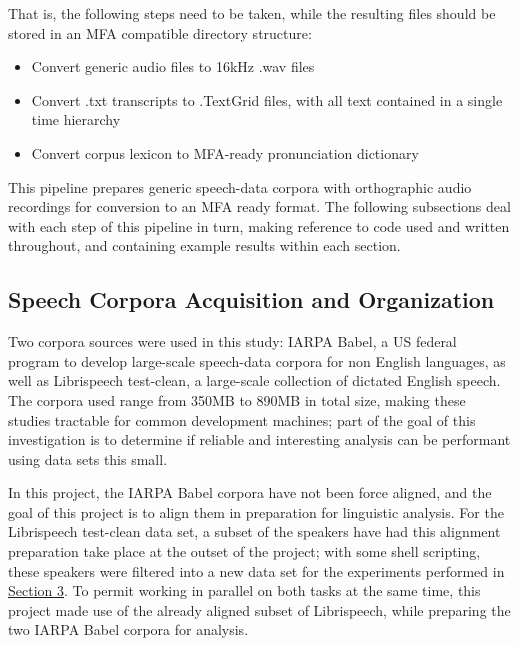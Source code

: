 \documentclass[11pt]{article}
\begin{document}
That is, the following steps need to be taken, while the resulting files should be stored in an MFA compatible directory structure:

\begin{singlespace}
\begin{itemize}
  \item Convert generic audio files to 16kHz .wav files
  \item Convert .txt transcripts to .TextGrid files, with all text contained in a single time hierarchy 
  \item Convert corpus lexicon to MFA-ready pronunciation dictionary
\end{itemize}
\end{singlespace}

This pipeline prepares generic speech-data corpora with orthographic audio recordings for conversion to an MFA ready format. The following subsections deal with each step of this pipeline in turn, making reference to code used and written throughout, and containing example results within each section.

\subsection{Speech Corpora Acquisition and Organization}

Two corpora sources were used in this study: IARPA Babel\cite{benowitz_iarpa_2019}\cite{andrus_iarpa_2016}, a US federal program to develop large-scale speech-data corpora for non English languages, as well as Librispeech test-clean\cite{panayotov_librispeech_2015}, a large-scale collection of dictated English speech. The corpora used range from 350MB to 890MB in total size, making these studies tractable for common development machines; part of the goal of this investigation is to determine if reliable and interesting analysis can be performant using data sets this small.

In this project, the IARPA Babel corpora have not been force aligned, and the goal of this project is to align them in preparation for linguistic analysis. For the Librispeech test-clean data set, a subset of the speakers have had this alignment preparation take place at the outset of the project; with some shell scripting, these speakers were filtered into a new data set for the experiments performed in \hyperlink{section.3}{Section 3}. To permit working in parallel on both tasks at the same time, this project made use of the already aligned subset of Librispeech, while preparing the two IARPA Babel corpora for analysis.
\end{document}
